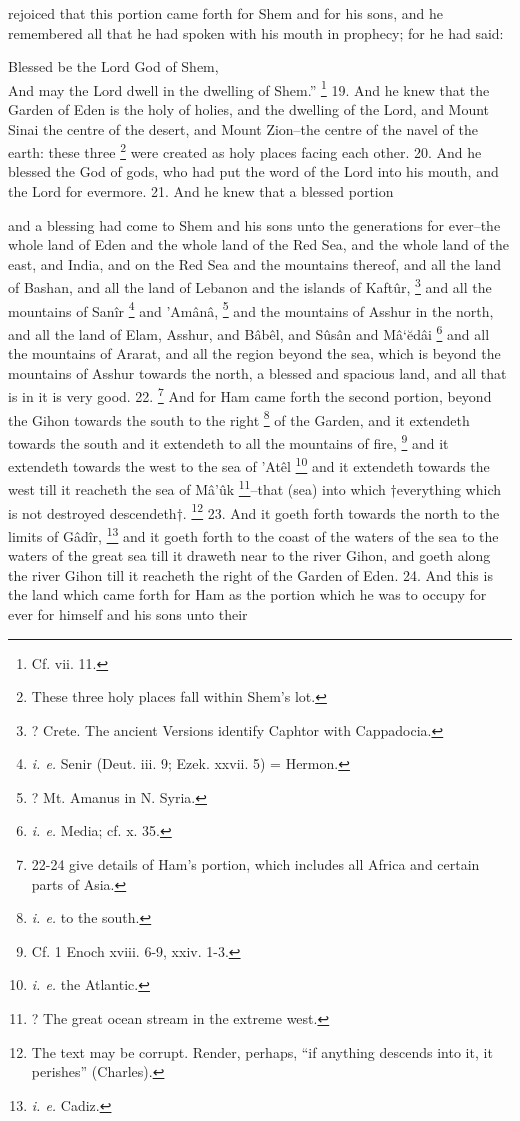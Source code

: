 rejoiced that this portion came forth for Shem and for his sons, and he remembered all that he had spoken with his mouth in prophecy; for he had said:

Blessed be the Lord God of Shem,\\
And may the Lord dwell in the dwelling of Shem.'' \footnote{Cf. vii. 11.} 19. And he knew that the Garden of Eden is the holy of holies, and the dwelling of the Lord, and Mount Sinai the centre of the desert, and Mount Zion--the centre of the navel of the earth: these three \footnote{These three holy places fall within Shem's lot.} were created as holy places facing each other. 20. And he blessed the God of gods, who had put the word of the Lord into his mouth, and the Lord for evermore. 21. And he knew that a blessed portion

and a blessing had come to Shem and his sons unto the generations for ever--the whole land of Eden and the whole land of the Red Sea, and the whole land of the east, and India, and on the Red Sea and the mountains thereof, and all the land of Bashan, and all the land of Lebanon and the islands of Kaftûr, \footnote{? Crete. The ancient Versions identify Caphtor with Cappadocia.} and all the mountains of Sanîr \footnote{\emph{i. e.} Senir (Deut. iii. 9; Ezek. xxvii. 5) = Hermon.} and ’Amânâ, \footnote{? Mt. Amanus in N. Syria.} and the mountains of Asshur in the north, and all the land of Elam, Asshur, and Bâbêl, and Sûsân and Mâ‘ĕdâi \footnote{\emph{i. e.} Media; cf. x. 35.} and all the mountains of Ararat, and all the region beyond the sea, which is beyond the mountains of Asshur towards the north, a blessed and spacious land, and all that is in it is very good. 22. \footnote{22-24 give details of Ham's portion, which includes all Africa and certain parts of Asia.} And for Ham came forth the second portion, beyond the Gihon towards the south to the right \footnote{\emph{i. e.} to the south.} of the Garden, and it extendeth towards the south and it extendeth to all the mountains of fire, \footnote{Cf. 1 Enoch xviii. 6-9, xxiv. 1-3.} and it extendeth towards the west to the sea of ’Atêl \footnote{\emph{i. e.} the Atlantic.} and it extendeth towards the west till it reacheth the sea of Mâ’ûk \footnote{? The great ocean stream in the extreme west.}--that (sea) into which †everything which is not destroyed descendeth†. \footnote{The text may be corrupt. Render, perhaps, ``if anything descends into it, it perishes'' (Charles).} 23. And it goeth forth towards the north to the limits of Gâdîr, \footnote{\emph{i. e.} Cadiz.} and it goeth forth to the coast of the waters of the sea to the waters of the great sea till it draweth near to the river Gihon, and goeth along the river Gihon till it reacheth the right of the Garden of Eden. 24. And this is the land which came forth for Ham as the portion which he was to occupy for ever for himself and his sons unto their


